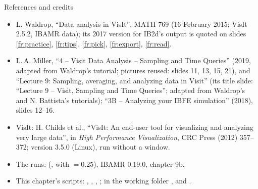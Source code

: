\documentclass[aspectratio=169,11pt]{beamer}
\begin{document}
\begin{frame}{References and credits}
\label{fr:refs}
\scriptsize
\begin{itemize}
  \item L. Waldrop, ``Data analysis in VisIt'', MATH 769 (16 February 2015; VisIt 2.5.2, IBAMR data); its 2017 version for IB2d's  output is quoted on slides \ref{fr:practice}, \ref{fr:tips}, \ref{fr:pick}, \ref{fr:export}, \ref{fr:read}.
  \item L.\,A. Miller, ``4 -- Visit Data Analysis -- Sampling and Time Queries'' (2019, adapted from Waldrop's tutorial; pictures reused: slides 11, 13, 15, 21), and ``Lecture 9: Sampling, averaging, and analyzing data in Visit'' (its title slide: ``Lecture 9 -- Visit, Sampling and Time Queries''; adapted from Waldrop's and N. Battista's tutorials); ``3B -- Analyzing your IBFE simulation'' (2018), slides 12--16.
  \item VisIt: H. Childs et al., ``VisIt: An end-user tool for visualizing and analyzing very large data'', in \emph{High Performance Visualization}, CRC Press (2012) 357--372; version 3.5.0 (Linux), run without a window.
  \item The runs:  (,  with  $= 0.25$), IBAMR 0.19.0, chapter 9b.
  \item This chapter's scripts: , , , ; in the working folder ,  and .
\end{itemize}
\end{frame}
\end{document}
